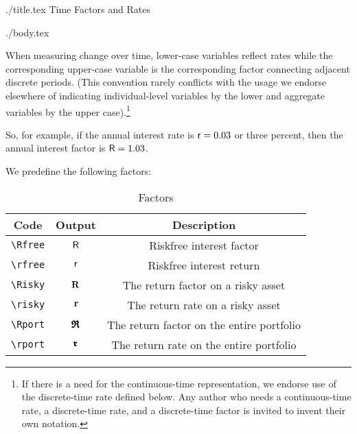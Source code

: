\documentclass{econtex}
\begin{document}
\begin{verbatimwrite}{./title.tex}
Time Factors and Rates
\end{verbatimwrite}

\title{}

\date{\today}
\maketitle 

\begin{verbatimwrite}{./body.tex}

  When measuring change over time, lower-case variables reflect rates
  while the corresponding upper-case variable is the corresponding
  factor connecting adjacent discrete periods.  (This
  convention rarely conflicts with the usage we endorse elsewhere of
  indicating individual-level variables by the lower and aggregate
  variables by the upper case).\footnote{If there is a need for the continuous-time 
representation, we endorse use of the discrete-time rate defined below.  Any
author who needs a continuous-time rate, a discrete-time rate, and a discrete-time factor
is invited to invent their own notation.}

So, for example, if the annual interest rate is $\mathsf{r}=0.03$ or three percent, then 
the annual interest factor is $\mathsf{R}=1.03$.%

We predefine the following factors:
\begin{table}[h]
	\centering
	\begin{tabular}{|ccc|} 		
		\hline
Code    & Output & Description 
\\ \hline 
   \verb|\Rfree| & $\mathsf{R}$     & Riskfree interest factor
\\ \verb|\rfree| & $\mathsf{r}$     & Riskfree interest return
\\ \verb|\Risky| & $\mathbf{R}$     & The return factor on a risky asset
\\ \verb|\risky| & $\mathbf{r}$     & The return rate on a risky asset
\\ \verb|\Rport| & $\pmb{\mathfrak{R}}$     & The return factor on the entire portfolio
\\ \verb|\rport| & $\pmb{\mathfrak{r}}$     & The return rate on the entire portfolio
\\	\hline
	\end{tabular}
	\caption{Factors}
	\label{table:Factors}
\end{table}	


\end{verbatimwrite}
\end{document}
